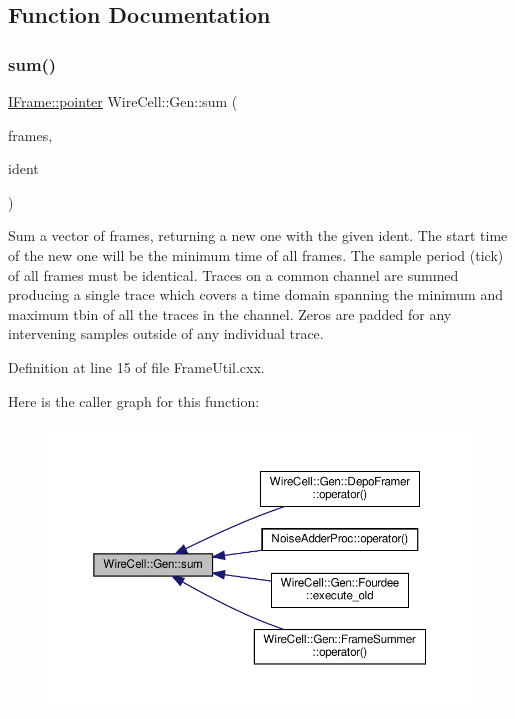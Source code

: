 \subsection{Function Documentation}
\mbox{\label{namespace_wire_cell_1_1_gen_a9e70fc8975c3ffb3d2f9fc71bc453516}} 
\subsubsection{\texorpdfstring{sum()}{sum()}}
{\footnotesize\ttfamily \hyperlink{class_wire_cell_1_1_i_data_aff870b3ae8333cf9265941eef62498bc}{I\+Frame\+::pointer} Wire\+Cell\+::\+Gen\+::sum (\begin{DoxyParamCaption}\item[{std\+::vector$<$ \hyperlink{class_wire_cell_1_1_i_data_aff870b3ae8333cf9265941eef62498bc}{I\+Frame\+::pointer} $>$}]{frames,  }\item[{int}]{ident }\end{DoxyParamCaption})}

Sum a vector of frames, returning a new one with the given ident. The start time of the new one will be the minimum time of all frames. The sample period (tick) of all frames must be identical. Traces on a common channel are summed producing a single trace which covers a time domain spanning the minimum and maximum tbin of all the traces in the channel. Zeros are padded for any intervening samples outside of any individual trace. 

Definition at line 15 of file Frame\+Util.\+cxx.

Here is the caller graph for this function\+:
\nopagebreak
\begin{figure}[H]
\begin{center}
\leavevmode
\includegraphics[width=350pt]{namespace_wire_cell_1_1_gen_a9e70fc8975c3ffb3d2f9fc71bc453516_icgraph}
\end{center}
\end{figure}
